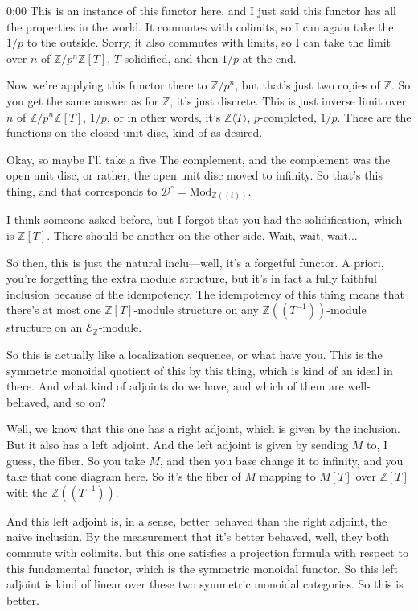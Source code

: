 \begin{unfinished}{0:00}
This is an instance of this functor here, and I just said this functor has all the properties in the world. It commutes with colimits, so I can again take the $1/p$ to the outside. Sorry, it also commutes with limits, so I can take the limit over $n$ of $\mathbb{Z}/p^n\mathbb{Z}[T]$, $T$-solidified, and then $1/p$ at the end.

Now we're applying this functor there to $\mathbb{Z}/p^n$, but that's just two copies of $\mathbb{Z}$. So you get the same answer as for $\mathbb{Z}$, it's just discrete. This is just inverse limit over $n$ of $\mathbb{Z}/p^n\mathbb{Z}[T]$, $1/p$, or in other words, it's $\mathbb{Z}\langle T\rangle$, $p$-completed, $1/p$. These are the functions on the closed unit disc, kind of as desired.

Okay, so maybe I'll take a five
The complement, and the complement was the open unit disc, or rather, the open unit disc moved to infinity. So that's this thing, and that corresponds to $\mathcal{D}^\circ = \mathrm{Mod}_{\mathbb{Z}((t))}$.

I think someone asked before, but I forgot that you had the solidification, which is $\mathbb{Z}[T]$. There should be another on the other side. Wait, wait, wait...

So then, this is just the natural inclu---well, it's a forgetful functor. A priori, you're forgetting the extra module structure, but it's in fact a fully faithful inclusion because of the idempotency. The idempotency of this thing means that there's at most one $\mathbb{Z}[T]$-module structure on any $\mathbb{Z}((T^{-1}))$-module structure on an $\mathcal{E}_{\mathbb{Z}}$-module.

So this is actually like a localization sequence, or what have you. This is the symmetric monoidal quotient of this by this thing, which is kind of an ideal in there. And what kind of adjoints do we have, and which of them are well-behaved, and so on?

Well, we know that this one has a right adjoint, which is given by the inclusion. But it also has a left adjoint. And the left adjoint is given by sending $M$ to, I guess, the fiber. So you take $M$, and then you base change it to infinity, and you take that cone diagram here. So it's the fiber of $M$ mapping to $M[T]$ over $\mathbb{Z}[T]$ with the $\mathbb{Z}((T^{-1}))$.

And this left adjoint is, in a sense, better behaved than the right adjoint, the naive inclusion. By the measurement that it's better behaved, well, they both commute with colimits, but this one satisfies a projection formula with respect to this fundamental functor, which is the symmetric monoidal functor. So this left adjoint is kind of linear over these two symmetric monoidal categories. So this is better.


\end{unfinished}
